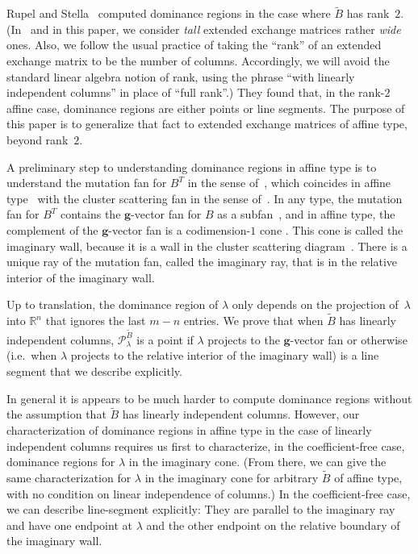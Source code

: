 \documentclass{amsart}
\theoremstyle{definition}
\theoremstyle{remark}
\numberwithin{equation}{section}
\newcommand{\reals}{\mathbb R}
\newcommand{\0}{{\mathbf{0}}}
\newcommand{\g}{\mathbf{g}}
\newcommand{\tB}{{\tilde{B}}}
\renewcommand{\P}{\mathcal{P}}
\begin{document}
Rupel and Stella~\cite{RSDom} computed dominance regions in the case where $\tB$ has rank~$2$.
(In~\cite{RSDom} and in this paper, we consider \emph{tall} extended exchange matrices rather \emph{wide} ones.
Also, we follow the usual practice of taking the ``rank'' of an extended exchange matrix to be the number of columns.
Accordingly, we will avoid the standard linear algebra notion of rank, using the phrase ``with linearly independent columns'' in place of ``full rank''.)
They found that, in the rank-$2$ affine case, dominance regions are either points or line segments.
The purpose of this paper is to generalize that fact to extended exchange matrices of affine type, beyond rank~$2$.

A preliminary step to understanding dominance regions in affine type is to understand the mutation fan for $B^T$ in the sense of~\cite{universal}, which coincides in affine type~\cite[Theorem~2.10]{affscat} with the cluster scattering fan in the sense of~\cite{scatfan}.
In any type, the mutation fan for $B^T$ contains the $\g$-vector fan for $B$ as a subfan~\cite[Theorem~8.7]{universal}, and in affine type, the complement of the $\g$-vector fan is a codimension-$1$ cone \cite[Corollaries~1.3, 4.9]{afframe}.
This cone is called the imaginary wall, because it is a wall in the cluster scattering diagram~\cite{affscat}.
There is a unique ray of the mutation fan, called the imaginary ray, that is in the relative interior of the imaginary wall.  

Up to translation, the dominance region of $\lambda$ only depends on the projection of~$\lambda$ into $\reals^n$ that ignores the last $m-n$ entries.
We prove that when $\tB$ has linearly independent columns, $\P_\lambda^\tB$ is a point if $\lambda$ projects to the $\g$-vector fan or otherwise (i.e.\ when $\lambda$ projects to the relative interior of the imaginary wall) is a line segment that we describe explicitly.

In general it is appears to be much harder to compute dominance regions without the assumption that $\tB$ has linearly independent columns.
However, our characterization of dominance regions in affine type in the case of linearly independent columns requires us first to characterize, in the coefficient-free case, dominance regions for $\lambda$ in the imaginary cone.
(From there, we can give the same characterization for $\lambda$ in the imaginary cone for arbitrary $\tB$ of affine type, with no condition on linear independence of columns.)
In the coefficient-free case, we can describe line-segment explicitly:
They are parallel to the imaginary ray and have one endpoint at $\lambda$ and the other endpoint on the relative boundary of the imaginary wall.
\end{document}
